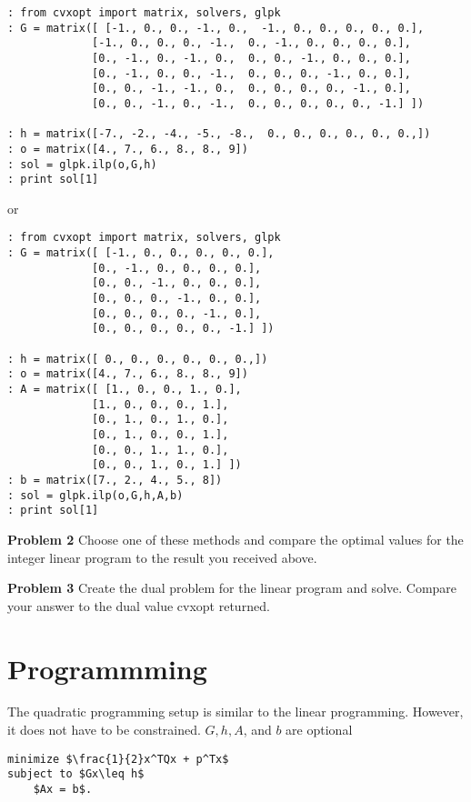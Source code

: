 \begin{lstlisting}
: from cvxopt import matrix, solvers, glpk
: G = matrix([ [-1., 0., 0., -1., 0.,  -1., 0., 0., 0., 0., 0.],
             [-1., 0., 0., 0., -1.,  0., -1., 0., 0., 0., 0.],
             [0., -1., 0., -1., 0.,  0., 0., -1., 0., 0., 0.],
             [0., -1., 0., 0., -1.,  0., 0., 0., -1., 0., 0.],
             [0., 0., -1., -1., 0.,  0., 0., 0., 0., -1., 0.],
             [0., 0., -1., 0., -1.,  0., 0., 0., 0., 0., -1.] ])

: h = matrix([-7., -2., -4., -5., -8.,  0., 0., 0., 0., 0., 0.,])
: o = matrix([4., 7., 6., 8., 8., 9])
: sol = glpk.ilp(o,G,h)
: print sol[1]
\end{lstlisting} 

or 
\begin{lstlisting}
: from cvxopt import matrix, solvers, glpk
: G = matrix([ [-1., 0., 0., 0., 0., 0.],
             [0., -1., 0., 0., 0., 0.],
             [0., 0., -1., 0., 0., 0.],
             [0., 0., 0., -1., 0., 0.],
             [0., 0., 0., 0., -1., 0.],
             [0., 0., 0., 0., 0., -1.] ])

: h = matrix([ 0., 0., 0., 0., 0., 0.,])
: o = matrix([4., 7., 6., 8., 8., 9])
: A = matrix([ [1., 0., 0., 1., 0.],
             [1., 0., 0., 0., 1.],
             [0., 1., 0., 1., 0.],
             [0., 1., 0., 0., 1.],
             [0., 0., 1., 1., 0.],
             [0., 0., 1., 0., 1.] ])
: b = matrix([7., 2., 4., 5., 8])
: sol = glpk.ilp(o,G,h,A,b)
: print sol[1]
\end{lstlisting} 


\textbf{Problem 2}
Choose one of these methods and compare the optimal values for the integer linear program to the result you received above. 


\textbf{Problem 3}
Create the dual problem for the linear program and solve. 
Compare your answer to the dual value cvxopt returned. 

\section*{Programmming}

The quadratic programming setup is similar to the linear programming. However, it does not have to be constrained. $G, h, A$, and $b$ are optional


\begin{lstlisting}[mathescape]
minimize $\frac{1}{2}x^TQx + p^Tx$
subject to $Gx\leq h$
	$Ax = b$.
\end{lstlisting}


